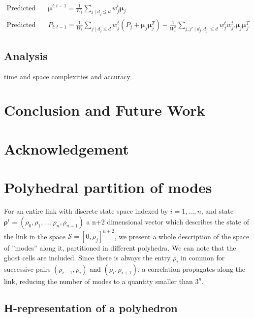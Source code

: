\documentclass[11pt]{article}
\numberwithin{equation}{section}
\numberwithin{figure}{section}
\numberwithin{table}{section}
\begin{document}
\begin{equation}
\begin{array}{ll}
\text{Predicted state: } & \boldsymbol \mu^{t:t-1} = \frac{1}{W_{t}}\sum_{j\mid d_{j}\leq d}{w_{j}^{t}\boldsymbol\mu_{j}}\\
\text{Predicted covariance: } & P_{t:t-1} = \frac{1}{W_{t}}\sum_{j\mid d_{j}\leq d}{w_{j}^{t}\left(P_{j} + \boldsymbol\mu_{j} \boldsymbol\mu^{T}_{j}\right)} - \frac{1}{W^{2}_{t}}\sum_{j,j'\mid d_{j},d_{j'}\leq d}{w_{j}^{t}w_{j'}^{t}\boldsymbol\mu_{j} \boldsymbol\mu^{T}_{j'}}
\end{array}
\label{eq:mixture6}
\end{equation}


\subsection{Analysis}

time and space complexities and accuracy

\section{Conclusion and Future Work}

\section{Acknowledgement}

\appendix

\section{Polyhedral partition of modes}

For an entire link with discrete state space indexed by $i = 1,...,n$, and state $\boldsymbol\rho^{t} = (\rho_{0},\rho_{1},...,\rho_{n},\rho_{n+1})$ a n+2 dimensional vector which describes the state of the link in the space $\mathcal{S} = [0,\rho_{j}]^{n+2}$, we present a whole description of the space of ''modes'' along it, partitioned in different polyhedra. We can note that the ghost cells are included. Since there is always the entry $\rho_{i}$ in common for successive pairs $(\rho_{i-1},\rho_{i})$ and $(\rho_{i},\rho_{i+1})$, a correlation propagates along the link, reducing the number of modes to a quantity smaller than $3^{n}$.


\subsection{H-representation of a polyhedron}\label{sec:polytope}
\end{document}
